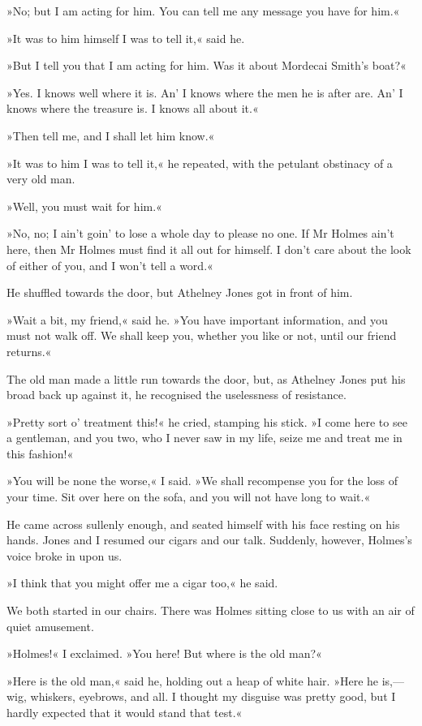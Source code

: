 »No; but I am acting for him. You can tell me any message you have for him.«

»It was to him himself I was to tell it,« said he.

»But I tell you that I am acting for him. Was it about Mordecai Smith's boat?«

»Yes. I knows well where it is. An' I knows where the men he is after are. An' I knows where the treasure is. I knows all about it.«

»Then tell me, and I shall let him know.«

»It was to him I was to tell it,« he repeated, with the petulant obstinacy of a very old man.

»Well, you must wait for him.«

»No, no; I ain't goin' to lose a whole day to please no one. If Mr Holmes ain't here, then Mr Holmes must find it all out for himself. I don't care about the look of either of you, and I won't tell a word.«

He shuffled towards the door, but Athelney Jones got in front of him.

»Wait a bit, my friend,« said he. »You have important information, and you must not walk off. We shall keep you, whether you like or not, until our friend returns.«

The old man made a little run towards the door, but, as Athelney Jones put his broad back up against it, he recognised the uselessness of resistance.

»Pretty sort o' treatment this!« he cried, stamping his stick. »I come here to see a gentleman, and you two, who I never saw in my life, seize me and treat me in this fashion!«

»You will be none the worse,« I said. »We shall recompense you for the loss of your time. Sit over here on the sofa, and you will not have long to wait.«

He came across sullenly enough, and seated himself with his face resting on his hands. Jones and I resumed our cigars and our talk. Suddenly, however, Holmes's voice broke in upon us.

»I think that you might offer me a cigar too,« he said.

We both started in our chairs. There was Holmes sitting close to us with an air of quiet amusement.

»Holmes!« I exclaimed. »You here! But where is the old man?«

»Here is the old man,« said he, holding out a heap of white hair. »Here he is,—wig, whiskers, eyebrows, and all. I thought my disguise was pretty good, but I hardly expected that it would stand that test.«

